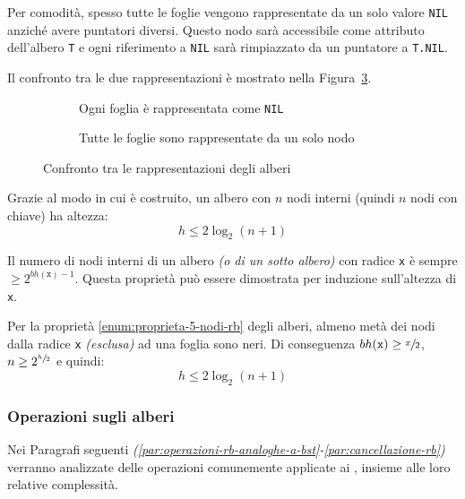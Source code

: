 \documentclass[italian, 10pt]{article}
\begin{document}
Per comodità, spesso tutte le foglie vengono rappresentate da un solo valore \texttt{NIL} anziché avere puntatori diversi.
Questo nodo sarà accessibile come attributo dell'albero \texttt{T} e ogni riferimento a \texttt{NIL} sarà rimpiazzato da un puntatore a \texttt{T.NIL}.

\bigskip
Il confronto tra le due rappresentazioni è mostrato nella Figura~\ref{fig:confronto-tra-le-rappresentazioni-degli-alberi-RB}.

\begin{figure}[htbp]
  \bigskip
  \centering
  \begin{subfigure}[b]{.495\textwidth}
    \centering
    \caption{Ogni foglia è rappresentata come \texttt{NIL}}
    \bigskip
    \label{fig:foglia-rappresentata-come-NIL}
  \end{subfigure}
  \begin{subfigure}[b]{.495\textwidth}
    \centering
    \caption{Tutte le foglie sono rappresentate da un solo nodo}
    \bigskip
    \label{fig:foglie-rappresentate-da-un-solo-nodo}
  \end{subfigure}
  \caption{Confronto tra le rappresentazioni degli alberi \RB}
  \label{fig:confronto-tra-le-rappresentazioni-degli-alberi-RB}
  \bigskip
\end{figure}

\bigskip
Grazie al modo in cui è costruito, un albero \RB con \(n\) nodi interni (quindi \(n\) nodi con chiave) ha altezza:
\[h \leq 2 \log_2{(n+1)}\]

Il numero di nodi interni di un albero \textit{(o di un sotto albero)} con radice \texttt{x} è sempre \(\geq 2^{bh(\texttt{x})-1}\).
Questa proprietà può essere dimostrata per induzione sull'altezza di \texttt{x}.

Per la proprietà \ref{enum:proprieta-5-nodi-rb} degli alberi, almeno metà dei nodi dalla radice \texttt{x} \textit{(esclusa)} ad una foglia sono neri.
Di conseguenza \(bh(\texttt{x}) \geq \sfrac{x}{2}\), \(n \geq 2^{\sfrac{h}{2}}\) e quindi:
\[ h \leq 2 \log_2{(n+1)} \]

\subsubsection{Operazioni sugli alberi \RB}

Nei Paragrafi seguenti \textit{(\ref{par:operazioni-rb-analoghe-a-bst}-\ref{par:cancellazione-rb})} verranno analizzate delle operazioni comunemente applicate ai \BST, insieme alle loro relative complessità.
\end{document}
